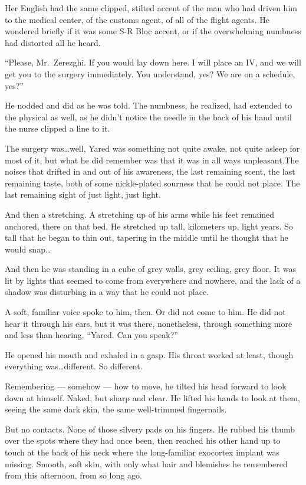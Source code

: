 Her English had the same clipped, stilted accent of the man who had driven him to the medical center, of the customs agent, of all of the flight agents. He wondered briefly if it was some S-R Bloc accent, or if the overwhelming numbness had distorted all he heard.

``Please, Mr.~Zerezghi. If you would lay down here. I will place an IV, and we will get you to the surgery immediately. You understand, yes? We are on a schedule, yes?''

He nodded and did as he was told. The numbness, he realized, had extended to the physical as well, as he didn't notice the needle in the back of his hand until the nurse clipped a line to it.

The surgery was\ldots well, Yared was something not quite awake, not quite asleep for most of it, but what he did remember was that it was in all ways unpleasant.The noises that drifted in and out of his awareness, the last remaining scent, the last remaining taste, both of some nickle-plated sourness that he could not place. The last remaining sight of just light, just light.

And then a stretching. A stretching up of his arms while his feet remained anchored, there on that bed. He stretched up tall, kilometers up, light years. So tall that he began to thin out, tapering in the middle until he thought that he would snap\ldots{}

And then he was standing in a cube of grey walls, grey ceiling, grey floor. It was lit by lights that seemed to come from everywhere and nowhere, and the lack of a shadow was disturbing in a way that he could not place.

A soft, familiar voice spoke to him, then. Or did not come to him. He did not hear it through his ears, but it was there, nonetheless, through something more and less than hearing. ``Yared. Can you speak?''

He opened his mouth and exhaled in a gasp. His throat worked at least, though everything was\ldots different. So different.

Remembering — somehow — how to move, he tilted his head forward to look down at himself. Naked, but sharp and clear. He lifted his hands to look at them, seeing the same dark skin, the same well-trimmed fingernails.

But no contacts. None of those silvery pads on his fingers. He rubbed his thumb over the spots where they had once been, then reached his other hand up to touch at the back of his neck where the long-familiar exocortex implant was missing. Smooth, soft skin, with only what hair and blemishes he remembered from this afternoon, from so long ago.

